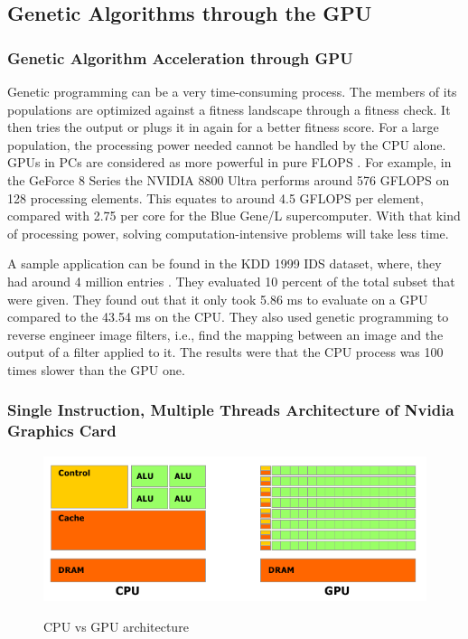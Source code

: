 \documentclass{acm_proc_article-sp}
\begin{document}
\subsection{Genetic Algorithms through the GPU}
\subsubsection{Genetic Algorithm Acceleration through GPU}
Genetic programming can be a very time-consuming process.  The members of its
populations are optimized against a fitness landscape through a fitness check. It
then tries the output or plugs it in again for a better fitness score. For a large
population, the processing power needed cannot be handled by the CPU alone. GPUs in
PCs are considered as more powerful in pure FLOPS \cite{Banzhaf09}.
For example, in the GeForce 8 Series the NVIDIA 8800 Ultra performs around 576 GFLOPS
on 128 processing elements. This equates to around 4.5 GFLOPS per element, compared
with 2.75 per core for the Blue Gene/L supercomputer.  With that kind of processing power, 
solving computation-intensive problems will take less time.  

A sample application can be found in the KDD 1999 IDS dataset, where, they had around
4 million entries \cite{Banzhaf09}. They evaluated 10 percent of the total subset
that were given. They found out that it only took 5.86 ms to evaluate on a GPU
compared to the 43.54 ms on the CPU. They also used genetic programming to
reverse engineer image filters, i.e., find the mapping between an image and the
output of a filter applied to it. The results were that the CPU process was 100
times slower than the GPU one. 

\subsubsection{Single Instruction, Multiple Threads Architecture of Nvidia
Graphics Card}


\begin{figure}
	\centering
		\graphicspath{{images/}}
		\includegraphics[width=190 pt]{cpu_gpu_blackandwhite.png}
	\caption{CPU vs GPU architecture}
	\cite{pdf:NVCudaPrgGuide}
	\label{fig:gpu_diagram}
\end{figure}
\end{document}
